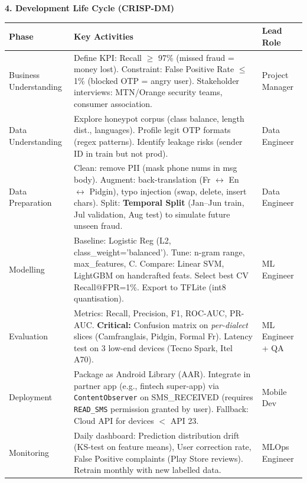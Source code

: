 \documentclass[11pt]{article}
\begin{document}
\begin{exemplebox}
\textbf{4. Development Life Cycle (CRISP-DM)}
\begin{center}
\begin{tabularx}{\linewidth}{|l|X|l|}
\hline
\rowcolor{popblueL}
\textbf{Phase} & \textbf{Key Activities} & \textbf{Lead Role} \\
\hline
Business Understanding & Define KPI: Recall $\ge$ 97\% (missed fraud = money lost). Constraint: False Positive Rate $\le$ 1\% (blocked OTP = angry user). Stakeholder interviews: MTN/Orange security teams, consumer association. & Project Manager \\
\hline
Data Understanding & Explore honeypot corpus (class balance, length dist., languages). Profile legit OTP formats (regex patterns). Identify leakage risks (sender ID in train but not prod). & Data Engineer \\
\hline
Data Preparation & Clean: remove PII (mask phone nums in msg body). Augment: back-translation (Fr $\leftrightarrow$ En $\leftrightarrow$ Pidgin), typo injection (swap, delete, insert chars). Split: \textbf{Temporal Split} (Jan--Jun train, Jul validation, Aug test) to simulate future unseen fraud. & Data Engineer \\
\hline
Modelling & Baseline: Logistic Reg (L2, class\_weight='balanced'). Tune: n-gram range, max\_features, C. Compare: Linear SVM, LightGBM on handcrafted feats. Select best CV Recall@FPR=1\%. Export to TFLite (int8 quantisation). & ML Engineer \\
\hline
Evaluation & Metrics: Recall, Precision, F1, ROC-AUC, PR-AUC. \textbf{Critical:} Confusion matrix on \emph{per-dialect} slices (Camfranglais, Pidgin, Formal Fr). Latency test on 3 low-end devices (Tecno Spark, Itel A70). & ML Engineer + QA \\
\hline
Deployment & Package as Android Library (AAR). Integrate in partner app (e.g., fintech super-app) via \texttt{ContentObserver} on SMS\_RECEIVED (requires \texttt{READ\_SMS} permission granted by user). Fallback: Cloud API for devices $<$ API 23. & Mobile Dev \\
\hline
Monitoring & Daily dashboard: Prediction distribution drift (KS-test on feature means), User correction rate, False Positive complaints (Play Store reviews). Retrain monthly with new labelled data. & MLOps Engineer \\
\hline
\end{tabularx}
\end{center}


\end{exemplebox}
\end{document}
